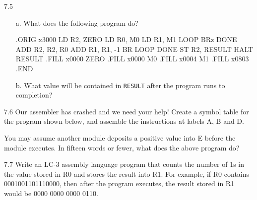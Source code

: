 \documentclass{patt}
\begin{document}
\begin{exercises}
\item[7.5]
\begin{enumerate}[a.]
\item[a.]  What does the following program do?
\bigskip
\medskip
\vspace{-2pt}
\begin{colorverbatim}
                .ORIG   x3000
                LD      R2, ZERO
                LD      R0, M0
                LD      R1, M1
        LOOP    BRz     DONE
                ADD     R2, R2, R0
                ADD     R1, R1, -1
                BR      LOOP
        DONE    ST      R2, RESULT
                HALT
        RESULT  .FILL   x0000
        ZERO    .FILL   x0000
        M0      .FILL   x0004
        M1      .FILL   x0803
                .END
\end{colorverbatim}
\bigskip
\medskip
\vspace{-2pt}

\item[b.]  What value will be contained in {\tt RESULT} after
  the program runs to completion?
\end{enumerate}

\item[7.6] Our assembler has crashed and we need your help! Create 
  a symbol table for the program shown below, and assemble the 
  instructions at labels A, B and D.
\bigskip
\medskip
\vspace{-2pt}
\bigskip
\medskip
\vspace{-2pt}

\noindent
You may assume another module deposits a positive value into E 
before the module executes. In fifteen words or fewer, what does 
the above program do?

\item[7.7] Write an LC-3 assembly language program that counts the
  number of 1s in the value stored in R0 and stores the result into
  R1. For example, if R0 contains 0001001101110000, then after the
  program executes, the result stored in R1 would be 0000 0000 0000
  0110.


\end{exercises}
\end{document}
